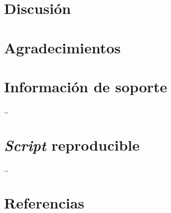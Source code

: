 \documentclass[11pt,]{article}
\begin{document}
\section{Discusión}\label{discusiuxf3n}

\section{Agradecimientos}\label{agradecimientos}

\section{Información de soporte}\label{informaciuxf3n-de-soporte}

\ldots

\section{\texorpdfstring{\emph{Script}
reproducible}{Script reproducible}}\label{script-reproducible}

\ldots

\section{Referencias}\label{referencias}




\newpage
\singlespacing 
\end{document}
